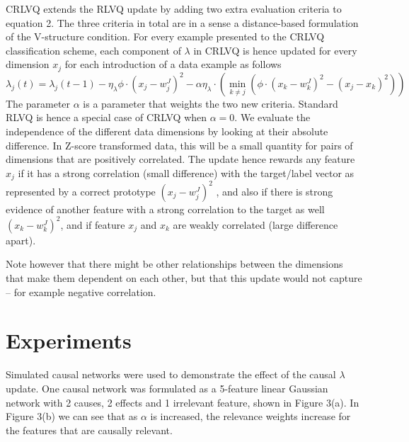 \documentclass{esannV2}
\begin{document}
CRLVQ extends the RLVQ update by adding two extra evaluation criteria to equation 2. The three criteria in total are in a sense a distance-based formulation of the V-structure condition. For every example presented to the CRLVQ classification scheme, each component of $\lambda$ in CRLVQ is hence updated for every dimension $x_j$ for each introduction of a data example as follows
%
\begin{equation} 
\lambda_j(t) = \lambda_j(t-1) - \eta_\lambda \phi \cdot (x_j - w_j^J)^2 - \alpha \eta_\lambda \cdot \left( \min_{k \neq j}\left(\phi \cdot (x_k - w_k^J)^2 - (x_j - x_k)^2 \right) \right)
\end{equation}
%
The parameter $\alpha$ is a parameter that weights the two new criteria. Standard RLVQ is hence a special case of CRLVQ when $\alpha = 0$. We evaluate the independence of the different data dimensions by looking at their absolute difference. In Z-score transformed data, this will be a small quantity for pairs of dimensions that are positively correlated. The update hence rewards any feature $x_j$ if it has a strong correlation (small difference) with the target/label vector as represented by a correct prototype $(x_j - w_j^J)^2$ , and also if there is strong evidence of another feature with a strong correlation to the target as well $(x_k - w_k^J)^2$, and if feature $x_j$ and $x_k$ are weakly correlated (large difference apart).

Note however that there might be other relationships between the dimensions that make them dependent on each other, but that this update would not capture -- for example negative correlation. 

\section{Experiments}
\label{sec:Experiments}

Simulated causal networks were used to demonstrate the effect of the causal $\lambda$ update. One causal network was formulated as a 5-feature linear Gaussian network with 2 causes, 2 effects and 1 irrelevant feature, shown in Figure 3(a). In Figure 3(b) we can see that as $\alpha$ is increased, the relevance weights increase for the features that are causally relevant. 
\end{document}

